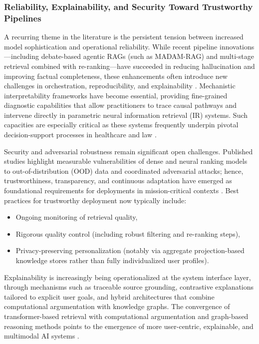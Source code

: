 \subsubsection{Reliability, Explainability, and Security Toward Trustworthy Pipelines}

A recurring theme in the literature is the persistent tension between increased model sophistication and operational reliability. While recent pipeline innovations—including debate-based agentic RAGs (such as MADAM-RAG) and multi-stage retrieval combined with re-ranking—have succeeded in reducing hallucination and improving factual completeness, these enhancements often introduce new challenges in orchestration, reproducibility, and explainability \cite{ref2,ref3,ref5,ref21,ref28,ref39,ref46,ref50,ref55,ref61}. Mechanistic interpretability frameworks have become essential, providing fine-grained diagnostic capabilities that allow practitioners to trace causal pathways and intervene directly in parametric neural information retrieval (IR) systems. Such capacities are especially critical as these systems frequently underpin pivotal decision-support processes in healthcare and law \cite{ref33,ref34,ref53}.

Security and adversarial robustness remain significant open challenges. Published studies highlight measurable vulnerabilities of dense and neural ranking models to out-of-distribution (OOD) data and coordinated adversarial attacks; hence, trustworthiness, transparency, and continuous adaptation have emerged as foundational requirements for deployments in mission-critical contexts \cite{ref2,ref7,ref37,ref49,ref51,ref55,ref61,ref62}. Best practices for trustworthy deployment now typically include:
\begin{itemize}
  \item Ongoing monitoring of retrieval quality,
  \item Rigorous quality control (including robust filtering and re-ranking steps),
  \item Privacy-preserving personalization (notably via aggregate projection-based knowledge stores rather than fully individualized user profiles).
\end{itemize}
\cite{ref21,ref23,ref30,ref48}

Explainability is increasingly being operationalized at the system interface layer, through mechanisms such as traceable source grounding, contrastive explanations tailored to explicit user goals, and hybrid architectures that combine computational argumentation with knowledge graphs. The convergence of transformer-based retrieval with computational argumentation and graph-based reasoning methods points to the emergence of more user-centric, explainable, and multimodal AI systems \cite{ref17,ref24,ref29,ref36,ref37,ref39,ref40,ref43,ref54}.

